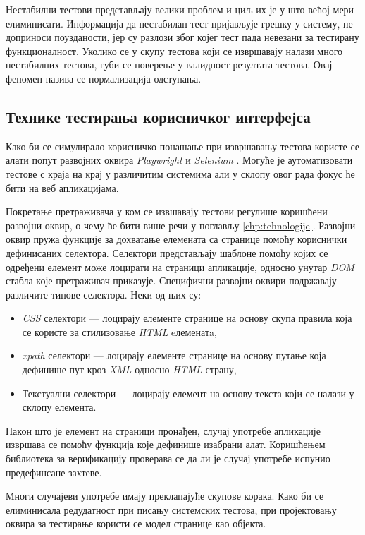 \documentclass[12pt,oneside]{memoir}
\begin{document}
Нестабилни тестови представљају велики проблем и циљ их је у што већој мери елиминисати. Информација да нестабилан тест пријављује грешку у систему, не доприноси поузданости, јер су разлози због којег тест пада невезани за тестирану функционалност. Уколико се у скупу тестова који се извршавају налази много нестабилних тестова, губи се поверење у валидност резултата тестова. Овај феномен назива се нормализација одступања.



\subsection{Технике тестирања корисничког интерфејса}

Како би се симулирало корисничко понашање при извршавању тестова користе се алати попут развојних оквира \textit{Playwright} \cite{playwright} и \textit{Selenium} \cite{playwrightVsSelenium}. Могуће је аутоматизовати тестове с краја на крај у различитим системима али у склопу овог рада фокус ће бити на веб апликацијама. 

Покретање претраживача у ком се извшавају тестови регулише коришћени развојни оквир, о чему ће бити више речи у поглављу \ref{chp:tehnologije}. Развојни оквир пружа функције за дохватање елемената са странице помоћу кориснички дефинисаних селектора. Селектори представљају шаблоне помоћу којих се одређени елемент може лоцирати на страници апликације, односно унутар \textit{DOM} стабла које претраживач приказује. Специфични развојни оквири подржавају различите типове селектора. Неки од њих су:

\begin{itemize}
\item \textit{CSS} селектори --- лоцирају елементе странице на основу скупа правила која се користе за стилизовање \textit{HTML} eлеменатa,
\item \textit{xpath} селектори --- лоцирају елементе странице на основу путање која дефинише пут кроз \textit{XML} односно \textit{HTML} страну,
\item Текстуални селектори --- лоцирају елемент на основу текста који се налази у склопу елемента.
\end{itemize}

Након што је елемент на страници пронађен, случај употребе апликације извршава се помоћу функција које дефинише изабрани алат. Коришћењем библиотека за верификацију проверава се да ли је случај употребе испунио предефинсане захтеве.

Многи случајеви употребе имају преклапајуће скупове корака. Како би се елиминисала редудатност при писању системских тестова, при пројектовању оквира за тестирање користи се модел странице као објекта.
\end{document}
